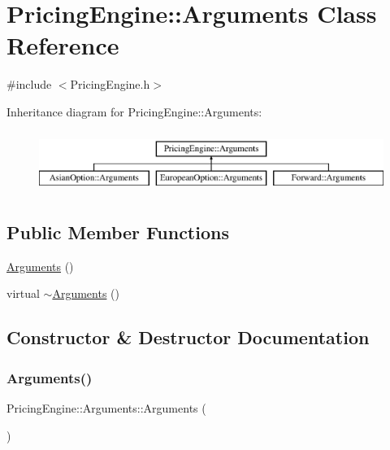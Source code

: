 \hypertarget{class_pricing_engine_1_1_arguments}{}\section{Pricing\+Engine\+:\+:Arguments Class Reference}
\label{class_pricing_engine_1_1_arguments}


{\ttfamily \#include $<$Pricing\+Engine.\+h$>$}

Inheritance diagram for Pricing\+Engine\+:\+:Arguments\+:\begin{figure}[H]
\begin{center}
\leavevmode
\includegraphics[height=2.000000cm]{class_pricing_engine_1_1_arguments}
\end{center}
\end{figure}
\subsection*{Public Member Functions}
\begin{DoxyCompactItemize}
\item 
\hyperlink{class_pricing_engine_1_1_arguments_a8c28435a8a4be10299e86d62ba72f5f8}{Arguments} ()
\item 
virtual \hyperlink{class_pricing_engine_1_1_arguments_a383465da5f7d0188a540264692ac2eff}{$\sim$\+Arguments} ()
\end{DoxyCompactItemize}


\subsection{Constructor \& Destructor Documentation}
\hypertarget{class_pricing_engine_1_1_arguments_a8c28435a8a4be10299e86d62ba72f5f8}{}\label{class_pricing_engine_1_1_arguments_a8c28435a8a4be10299e86d62ba72f5f8} 
\subsubsection{\texorpdfstring{Arguments()}{Arguments()}}
{\footnotesize\ttfamily Pricing\+Engine\+::\+Arguments\+::\+Arguments (\begin{DoxyParamCaption}{ }\end{DoxyParamCaption})\hspace{0.3cm}{\ttfamily [inline]}}

